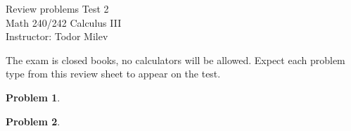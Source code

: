 \documentclass{article}
\newtheorem{problem}{Problem}
\begin{document}
\begin{center}
\Large
Review problems Test 2\\ Math 240/242 Calculus III \\ \normalsize Instructor: Todor Milev
\end{center}


\noindent The exam is closed books, no calculators will be allowed. Expect each problem type from this review sheet to appear on the test.

\begin{problem}
 

\end{problem}


\begin{problem}

\end{problem}
\end{document}
